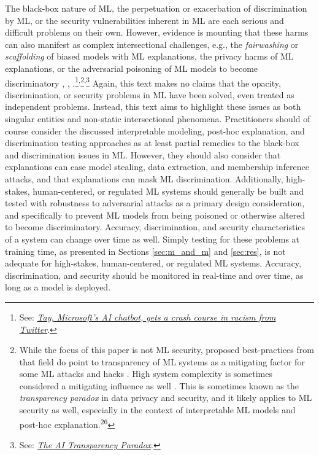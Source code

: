 \documentclass[information,article,submit,moreauthors,pdftex]{definitions/mdpi}
\begin{document}
The black-box nature of ML, the perpetuation or exacerbation of discrimination by ML, or the security vulnerabilities inherent in ML are each serious and difficult problems on their own. However, evidence is mounting that these harms can also manifest as complex intersectional challenges, e.g., the \textit{fairwashing} or \textit{scaffolding} of biased models with ML explanations, the privacy harms of ML explanations, or the adversarial poisoning of ML models to become discriminatory \cite{shokri2019privacy}, \cite{fair_washing}, \cite{scaffolding}.\footnote{See: \href{https://www.theguardian.com/technology/2016/mar/24/tay-microsofts-ai-chatbot-gets-a-crash-course-in-racism-from-twitter}{\textit{Tay, Microsoft's AI chatbot, gets a crash course in racism from Twitter}}.}\textsuperscript{,}\footnote{While the focus of this paper is not ML security, proposed best-practices from that field do point to transparency of ML systems as a mitigating factor for some ML attacks and hacks \cite{papernot2018marauder}. High system complexity is sometimes considered a mitigating influence as well \cite{hoare19811980}. This is sometimes known as the \textit{transparency paradox} in data privacy and security, and it likely applies to ML security as well, especially in the context of interpretable ML models and post-hoc explanation.\textsuperscript{26}}\textsuperscript{,}\footnote{See: \href{https://hbr.org/2019/12/the-ai-transparency-paradox}{\textit{The AI Transparency Paradox}}.} Again, this text makes no claims that the opacity, discrimination, or security problems in ML have been solved, even treated as independent problems. Instead, this text aims to highlight these issues as both singular entities and non-static intersectional phenomena. Practitioners should of course consider the discussed interpretable modeling, post-hoc explanation, and discrimination testing approaches as at least partial remedies to the black-box and discrimination issues in ML. However, they should also consider that explanations can ease model stealing, data extraction, and membership inference attacks, and that explanations can mask ML discrimination. Additionally, high-stakes, human-centered, or regulated ML systems should generally be built and tested with robustness to adversarial attacks as a primary design consideration, and specifically to prevent ML models from being poisoned or otherwise altered to become discriminatory. Accuracy, discrimination, and security characteristics of a system can change over time as well. Simply testing for these problems at training time, as presented in Sections \ref{sec:m_and_m} and \ref{sec:res}, is not adequate for high-stakes, human-centered, or regulated ML systems. Accuracy, discrimination, and security should be monitored in real-time and over time, as long as a model is deployed.
\end{document}
